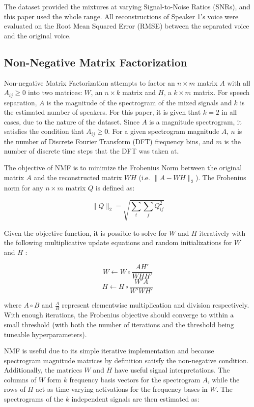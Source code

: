 \documentclass[12pt,chapterheads]{ucsd}
\begin{document}
The dataset provided the mixtures at varying Signal-to-Noise Ratios (SNRs), and this paper used the whole range. All reconstructions of Speaker 1's voice were evaluated on the Root Mean Squared Error (RMSE) between the separated voice and the original voice.

\subsection{Non-Negative Matrix Factorization}
Non-negative Matrix Factorization attempts to factor an $n \times m$ matrix $A$ with all $A_{ij} \geq 0$ into two matrices: $W$, an $n \times k$ matrix and $H$, a $k \times m$ matrix. For speech separation, $A$ is the magnitude of the spectrogram of the mixed signals and $k$ is the estimated number of speakers. For this paper, it is given that $k=2$ in all cases, due to the nature of the dataset. Since $A$ is a magnitude spectrogram, it satisfies the condition that $A_{ij} \geq 0$. For a given spectrogram magnitude $A$, $n$ is the number of Discrete Fourier Transform (DFT) frequency bins, and $m$ is the number of discrete time steps that the DFT was taken at.

The objective of NMF is to minimize the Frobenius Norm between the original matrix $A$ and the reconstructed matrix $WH$ (i.e. $\| A - WH\|_2$). The Frobenius norm for any $n \times m$ matrix $Q$ is defined as:

\begin{equation}
\| Q \|_2 = \sqrt{\sum\limits_{i} \sum\limits_{j} Q_{ij}^2}
\end{equation}

Given the objective function, it is possible to solve for $W$ and $H$ iteratively with the following multiplicative update equations and random initializations for $W$ and $H$ \cite{Lee00algorithmsfor}:

\begin{equation}
W \leftarrow W \circ \frac{AH'}{WHH'}
\end{equation}
\begin{equation}
H \leftarrow H \circ \frac{W'A}{W'WH'}
\end{equation}

where $A \circ B$ and $\frac{A}{B}$ represent elementwise multiplication and division respectively. With enough iterations, the Frobenius objective should converge to within a small threshold (with both the number of iterations and the threshold being tuneable hyperparameters).

NMF is useful due to its simple iterative implementation and because spectrogram magnitude matrices by definition satisfy the non-negative condition.  Additionally, the matrices $W$ and $H$ have useful signal interpretations. The columns of $W$ form $k$ frequency basis vectors for the spectrogram $A$, while the rows of $H$ act as time-varying activations for the frequency bases in $W$. The spectrograms of the $k$ independent signals are then estimated as:
\end{document}
